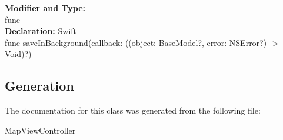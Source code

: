 \textbf{Modifier and Type:}\\
\tab func \\


\textbf{Declaration:}
\tab 
Swift\\

func saveInBackground(callback: ((object: BaseModel?, error: NSError?) -> Void)?)\\


\subsection{Generation}
The documentation for this class was generated from the following file\-:
\begin{DoxyCompactItemize}
\item MapViewController
\end{DoxyCompactItemize} 









